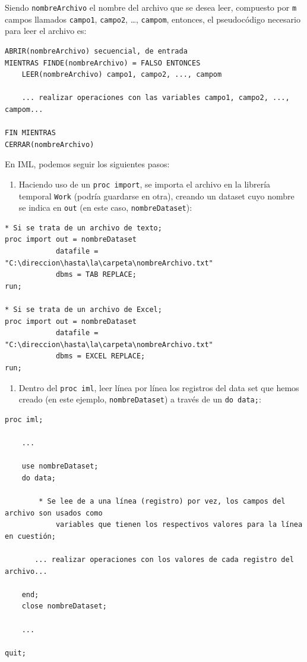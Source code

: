 \documentclass[]{book}
\providecommand{\tightlist}{%
  \setlength{\itemsep}{0pt}\setlength{\parskip}{0pt}}
\begin{document}
Siendo \texttt{nombreArchivo} el nombre del archivo que se desea leer, compuesto por \texttt{m} campos llamados \texttt{campo1}, \texttt{campo2}, \ldots{}, \texttt{campom}, entonces, el pseudocódigo necesario para leer el archivo es:

\begin{verbatim}
ABRIR(nombreArchivo) secuencial, de entrada
MIENTRAS FINDE(nombreArchivo) = FALSO ENTONCES
    LEER(nombreArchivo) campo1, campo2, ..., campom
    
    ... realizar operaciones con las variables campo1, campo2, ..., campom...
    
FIN MIENTRAS
CERRAR(nombreArchivo)
\end{verbatim}

En IML, podemos seguir los siguientes pasos:

\begin{enumerate}
\def\labelenumi{\arabic{enumi}.}
\tightlist
\item
  Haciendo uso de un \texttt{proc\ import}, se importa el archivo en la librería temporal \texttt{Work} (podría guardarse en otra), creando un dataset cuyo nombre se indica en \texttt{out} (en este caso, \texttt{nombreDataset}):
\end{enumerate}

\begin{verbatim}
* Si se trata de un archivo de texto;
proc import out = nombreDataset
            datafile = "C:\direccion\hasta\la\carpeta\nombreArchivo.txt"
            dbms = TAB REPLACE;
run;
            
* Si se trata de un archivo de Excel;
proc import out = nombreDataset
            datafile = "C:\direccion\hasta\la\carpeta\nombreArchivo.txt"
            dbms = EXCEL REPLACE;
run;
\end{verbatim}

\begin{enumerate}
\def\labelenumi{\arabic{enumi}.}
\setcounter{enumi}{1}
\tightlist
\item
  Dentro del \texttt{proc\ iml}, leer línea por línea los registros del data set que hemos creado (en este ejemplo, \texttt{nombreDataset}) a través de un \texttt{do\ data;}:
\end{enumerate}

\begin{verbatim}
proc iml;

    ...

    use nombreDataset;
    do data;
    
        * Se lee de a una línea (registro) por vez, los campos del archivo son usados como
            variables que tienen los respectivos valores para la línea en cuestión;
        
       ... realizar operaciones con los valores de cada registro del archivo...
            
    end;
    close nombreDataset;

    ...

quit;
\end{verbatim}
\end{document}

